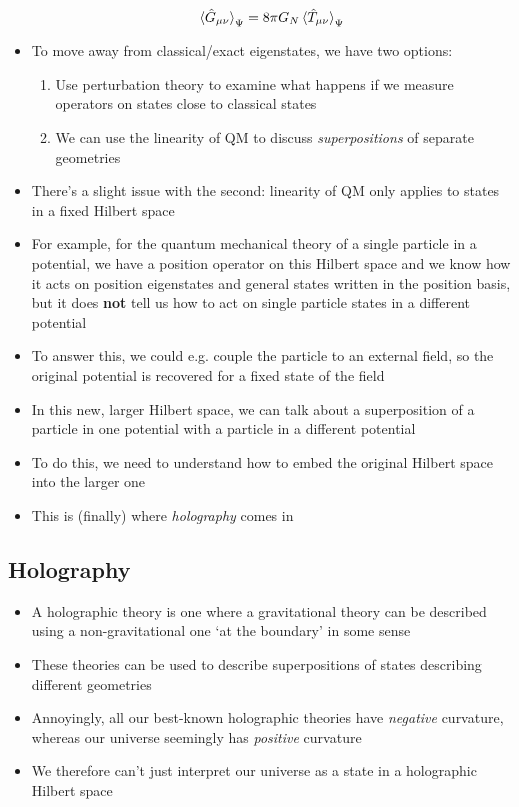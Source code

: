 \documentclass[12pt,a4paper]{article}
\numberwithin{equation}{section}
\begin{document}
\begin{itemize}
\begin{equation}
			\braket{\hat{G}_{\mu\nu}}_{\Psi}=8\pi G_{N}\braket{\hat{T}_{\mu\nu}}_{\Psi}
		\end{equation}
		\item To move away from classical/exact eigenstates, we have two options:
		\begin{enumerate}
			\item Use perturbation theory to examine what happens if we measure operators on states close to classical states
			\item We can use the linearity of QM to discuss \textit{superpositions} of separate geometries
		\end{enumerate}
		\item There's a slight issue with the second: linearity of QM only applies to states in a fixed Hilbert space
		\item For example, for the quantum mechanical theory of a single particle in a potential, we have a position operator on this Hilbert space and we know how it acts on position eigenstates and general states written in the position basis, but it does \textbf{not} tell us how to act on single particle states in a different potential
		\item To answer this, we could e.g. couple the particle to an external field, so the original potential is recovered for a fixed state of the field
		\item In this new, larger Hilbert space, we can talk about a superposition of a particle in one potential with a particle in a different potential
		\item To do this, we need to understand how to embed the original Hilbert space into the larger one
		\item This is (finally) where \textit{holography} comes in
	\end{itemize}
	\subsection{Holography}
	\begin{itemize}
		\item A holographic theory is one where a gravitational theory can be described using a non-gravitational one `at the boundary' in some sense
		\item These theories can be used to describe superpositions of states describing different geometries
		\item Annoyingly, all our best-known holographic theories have \textit{negative} curvature, whereas our universe seemingly has \textit{positive} curvature
		\item We therefore can't just interpret our universe as a state in a holographic Hilbert space
	\end{itemize}
\end{document}
